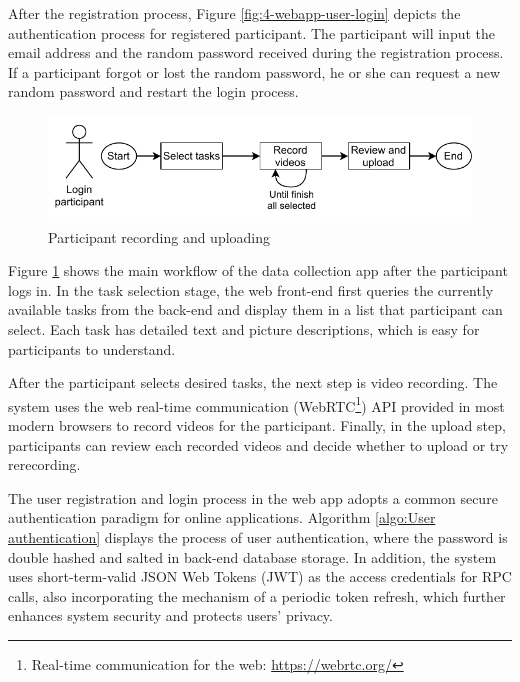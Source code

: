 After the registration process, Figure \ref{fig:4-webapp-user-login} depicts the authentication process for registered participant.
The participant will input the email address and the random password received during the registration process.
If a participant forgot or lost the random password, he or she can request a new random password and restart the login process.

\begin{figure}[!ht]
    \centering
    \includegraphics[width=\textwidth]{implementation/imgs/4-webapp-user-record.pdf}
    \caption{Participant recording and uploading}
    \label{fig:4-webapp-user-record}
\end{figure}

Figure \ref{fig:4-webapp-user-record} shows the main workflow of the data collection app after the participant logs in.
In the task selection stage, the web front-end first queries the currently available tasks from the back-end and display them in a list that participant can select.
Each task has detailed text and picture descriptions, which is easy for participants to understand.

After the participant selects desired tasks, the next step is video recording.
The system uses the web real-time communication (WebRTC\footnote{Real-time communication for the web: \url{https://webrtc.org/}}) API provided in most modern browsers to record videos for the participant.
Finally, in the upload step, participants can review each recorded videos and decide whether to upload or try rerecording.

The user registration and login process in the web app adopts a common secure authentication paradigm for online applications.
Algorithm \ref{algo:User authentication} displays the process of user authentication, where the password is double hashed and salted in back-end database storage.
In addition, the system uses short-term-valid JSON Web Tokens (JWT) as the access credentials for RPC calls, also incorporating the mechanism of a periodic token refresh, which further enhances system security and protects users' privacy.

